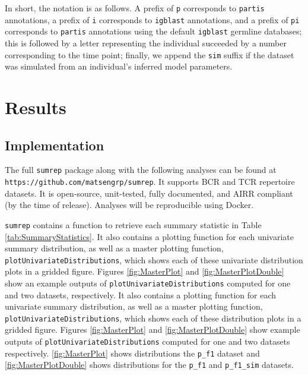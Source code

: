 \documentclass{article}
\begin{document}
In short, the notation is as follows.
A prefix of \texttt{p} corresponds to \texttt{partis} annotations, a prefix of \texttt{i} corresponds to \texttt{igblast} annotations, and a prefix of \texttt{pi} corresponds to \texttt{partis} annotations using the default \texttt{igblast} germline databases;
this is followed by a letter representing the individual succeeded by a number corresponding to the time point;
finally, we append the \texttt{sim} suffix if the dataset was simulated from an individual's inferred model parameters.

\section*{Results}

\subsection*{Implementation}
The full \texttt{sumrep} package along with the following analyses can be found at \texttt{https://github.com/matsengrp/sumrep}.
It supports BCR and TCR repertoire datasets.
It is open-source, unit-tested, fully documented, and AIRR compliant (by the time of release).
Analyses will be reproducible using Docker.

\texttt{sumrep} contains a function to retrieve each summary statistic in Table \ref{tab:SummaryStatistics}.
It also contains a plotting function for each univariate summary distribution, as well as a master plotting function, \texttt{plotUnivariateDistributions}, which shows each of these univariate distribution plots in a gridded figure.
Figures \ref{fig:MasterPlot} and \ref{fig:MasterPlotDouble} show an example outputs of \texttt{plotUnivariateDistributions} computed for one and two datasets, respectively.
It also contains a plotting function for each univariate summary distribution, as well as a master plotting function, \texttt{plotUnivariateDistributions}, which shows each of these distribution plots in a gridded figure.
Figures \ref{fig:MasterPlot} and \ref{fig:MasterPlotDouble} show example outputs of \texttt{plotUnivariateDistributions} computed for one and two datasets respectively.
\ref{fig:MasterPlot} shows distributions the \texttt{p\_f1} dataset and \ref{fig:MasterPlotDouble} shows distributions for the \texttt{p\_f1} and \texttt{p\_f1\_sim} datasets.
\end{document}
